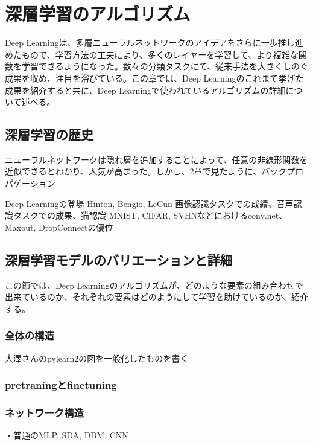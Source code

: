 \chapter{深層学習のアルゴリズム}
Deep Learningは、多層ニューラルネットワークのアイデアをさらに一歩推し進めたもので、学習方法の工夫により、多くのレイヤーを学習して、より複雑な関数を学習できるようになった。数々の分類タスクにて、従来手法を大きくしのぐ成果を収め、注目を浴びている。この章では、Deep Learningのこれまで挙げた成果を紹介すると共に、Deep Learningで使われているアルゴリズムの詳細について述べる。

\section{深層学習の歴史}
ニューラルネットワークは隠れ層を追加することによって、任意の非線形関数を近似できるとわかり、人気が高まった。しかし、2章で見たように、バックプロパゲーション

Deep Learningの登場 Hinton, Bengio, LeCun
画像認識タスクでの成績、音声認識タスクでの成果、猫認識
MNIST, CIFAR, SVHNなどにおけるconv.net、Maxout, DropConnectの優位

\section{深層学習モデルのバリエーションと詳細}
この節では、Deep Learningのアルゴリズムが、どのような要素の組み合わせで出来ているのか、それぞれの要素はどのようにして学習を助けているのか、紹介する。
\subsection{全体の構造}
大澤さんのpylearn2の図を一般化したものを書く
\subsection{pretraningとfinetuning}
\subsection{ネットワーク構造}
・普通のMLP, SDA, DBM, CNN
